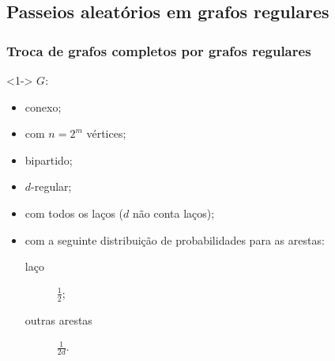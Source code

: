 \documentclass{beamer}
\theoremstyle{teoaxicorlem}
\theoremstyle{defnotnom}
\begin{document}
\subsection{Passeios aleatórios em grafos regulares}

\begin{frame}
  \frametitle{Troca de grafos completos por grafos regulares}
  \begin{block}<1->{}
    $G$:
    \begin{itemize}
    \item conexo;
    \item com $n=2^m$ vértices;
    \item bipartido;
    \item $d$-regular;
    \item com todos os laços ($d$ não conta laços);
    \item com a seguinte distribuição de probabilidades para as arestas:
      \begin{description}
      \item[laço] $\frac12$;
      \item[outras arestas] $\frac1{2d}$.
      \end{description}
    \end{itemize}
  \end{block}
\end{frame}
\end{document}
